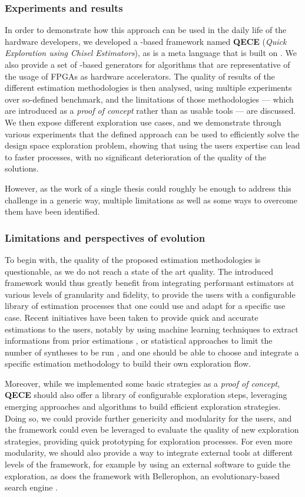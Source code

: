\subsubsection{Experiments and results}
In order to demonstrate how this approach can be used in the daily life of the hardware developers, we developed a \scala-based framework named {\bf QECE} ({\it Quick Exploration using Chisel Estimators}), as \chisel{} is a meta language that is built on \scala.
We also provide a set of \chisel-based generators for algorithms that are representative of the usage of FPGAs as hardware accelerators.
The quality of results of the different estimation methodologies is then analysed, using multiple experiments over so-defined benchmark, and the limitations of those methodologies --- which are introduced as a {\it proof of concept} rather than as usable tools --- are discussed.
We then expose different exploration use cases, and we demonstrate through various experiments that the defined approach can be used to efficiently solve the design space exploration problem, showing that using the users expertise can lead to faster processes, with no significant deterioration of the quality of the solutions.

However, as the work of a single thesis could roughly be enough to address this challenge in a generic way, multiple limitations as well as some ways to overcome them have been identified.

\subsubsection{Limitations and perspectives of evolution}
To begin with, the quality of the proposed estimation methodologies is questionable, as we do not reach a state of the art quality.
The introduced framework would thus greatly benefit from integrating performant estimators at various levels of granularity and fidelity, to provide the users with a configurable library of estimation processes that one could use and adapt for a specific use case.
Recent initiatives have been taken to provide quick and accurate estimations to the users, notably by using machine learning techniques to extract informations from prior estimations \cite{kwon_transfer_2020}, or statistical approaches to limit the number of syntheses to be run \cite{paletti_dovado_2021}, and one should be able to choose and integrate a specific estimation methodology to build their own exploration flow.

Moreover, while we implemented some basic strategies as a {\it proof of concept}, {\bf QECE} should also offer a library of configurable exploration steps, leveraging emerging approaches and algorithms %
to build efficient exploration strategies.
Doing so, we could provide further genericity and modularity for the users, and the framework could even be leveraged to evaluate the quality of new exploration strategies, providing quick prototyping for exploration processes.
For even more modularity, we should also provide a way to integrate external tools at different levels of the framework, for example by using an external software to guide the exploration, as does the \eidea{} framework with Bellerophon, an evolutionary-based search engine \cite{barone_multi-objective_2021}.

